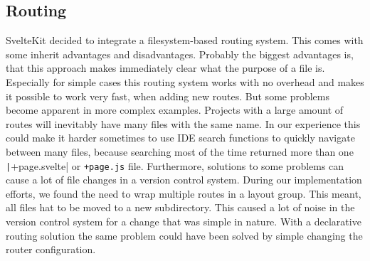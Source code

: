 








\subsection{Routing}
SvelteKit decided to integrate a filesystem-based routing system. This comes with some inherit advantages and disadvantages. Probably the biggest advantages is, that this approach makes immediately clear what the purpose of a file is. Especially for simple cases this routing system works with no overhead and makes it possible to work very fast, when adding new routes. But some problems become apparent in more complex examples. Projects with a large amount of routes will inevitably have many files with the same name. In our experience this could make it harder sometimes to use IDE search functions to quickly navigate between many files, because searching most of the time returned more than one \texttt|+page.svelte| or \texttt{+page.js} file. Furthermore, solutions to some problems can cause a lot of file changes in a version control system. During our implementation efforts, we found the need to wrap multiple routes in a layout group. This meant, all files hat to be moved to a new subdirectory. This caused a lot of noise in the version control system for a change that was simple in nature. With a declarative routing solution the same problem could have been solved by simple changing the router configuration.

